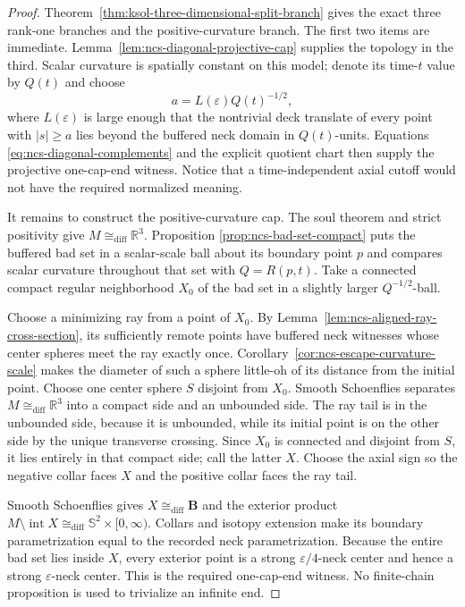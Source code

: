 \documentclass[10pt]{coll-l}
\newcommand{\R}{\mathbb{R}}
\newcommand{\Sph}{\mathbb{S}}
\newcommand{\diffeo}{\mathrel{\cong_{\mathrm{diff}}}}
\theoremstyle{definition}
\theoremstyle{remark}
\numberwithin{section}{chapter}
\numberwithin{equation}{chapter}
\begin{document}
\begin{proof}
Theorem~\ref{thm:ksol-three-dimensional-split-branch} gives the exact three
rank-one branches and the positive-curvature branch.  The first two items
are immediate.  Lemma~\ref{lem:ncs-diagonal-projective-cap} supplies the
topology in the third.  Scalar curvature is spatially constant on this
model; denote its time-$t$ value by $Q(t)$ and choose
\begin{equation}
                       a=L(\varepsilon)Q(t)^{-1/2},    \label{eq:ncs-diagonal-cutoff-scale}
\end{equation}
where $L(\varepsilon)$ is large enough that the nontrivial deck translate
of every point with $|s|\geq a$ lies beyond the buffered neck domain in
$Q(t)$-units.  Equations \eqref{eq:ncs-diagonal-complements} and the explicit
quotient chart then supply the projective one-cap-end witness.  Notice that
a time-independent axial cutoff would not have the required normalized
meaning.

It remains to construct the positive-curvature cap.  The soul theorem and
strict positivity give $M\diffeo\R^3$.  Proposition
\ref{prop:ncs-bad-set-compact} puts the buffered bad set in a scalar-scale
ball about its boundary point $p$ and compares scalar curvature throughout
that set with $Q=R(p,t)$.  Take a connected compact regular neighborhood
$X_0$ of the bad set in a slightly larger $Q^{-1/2}$-ball.

Choose a minimizing ray from a point of $X_0$.  By
Lemma~\ref{lem:ncs-aligned-ray-cross-section}, its sufficiently remote
points have buffered neck witnesses whose center spheres meet the ray
exactly once.  Corollary~\ref{cor:ncs-escape-curvature-scale} makes the
diameter of such a sphere little-oh of its distance from the initial
point.  Choose one center sphere $S$ disjoint from $X_0$.  Smooth
Schoenflies separates $M\diffeo\mathbb R^3$ into a compact side and an
unbounded side.  The ray tail is in the unbounded side, because it is
unbounded, while its initial point is on the other side by the unique
transverse crossing.  Since $X_0$ is connected and disjoint from $S$, it
lies entirely in that compact side; call the latter $X$.  Choose the axial
sign so the negative collar faces $X$ and the positive collar faces the
ray tail.

Smooth Schoenflies gives $X\diffeo\mathbf B$ and the exterior product
$M\setminus\operatorname{int}X\diffeo\Sph^2\times[0,\infty)$.  Collars
and isotopy extension make its boundary parametrization equal to the
recorded neck parametrization.  Because the entire bad set lies inside
$X$, every exterior point is a strong $\varepsilon/4$-neck center and hence
a strong $\varepsilon$-neck center.  This is the required one-cap-end
witness.  No finite-chain proposition is used to trivialize an infinite
end.
\end{proof}
\end{document}
